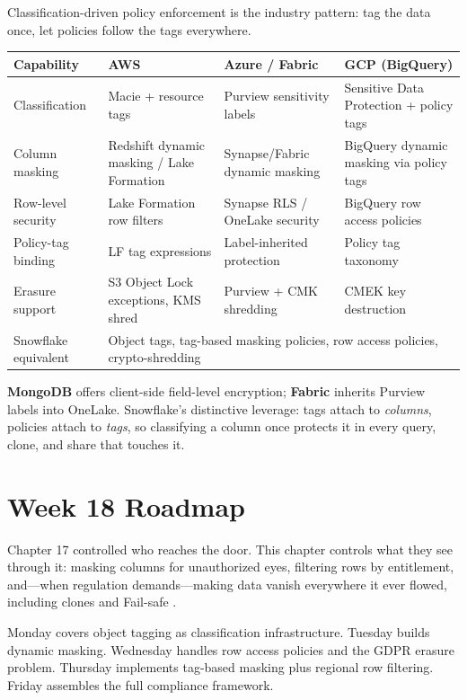 \begin{crosscloud}
Classification-driven policy enforcement is the industry pattern: tag the data once, let policies follow the tags everywhere.

\vspace{2mm}
{\footnotesize
\begin{tabular}{@{}p{2.8cm}p{3.0cm}p{3.0cm}p{3.0cm}@{}}
\toprule
\textbf{Capability} & \textbf{AWS} & \textbf{Azure / Fabric} & \textbf{GCP (BigQuery)} \\
\midrule
Classification & Macie + resource tags & Purview sensitivity labels & Sensitive Data Protection + policy tags \\
Column masking & Redshift dynamic masking / Lake Formation & Synapse/Fabric dynamic masking & BigQuery dynamic masking via policy tags \\
Row-level security & Lake Formation row filters & Synapse RLS / OneLake security & BigQuery row access policies \\
Policy-tag binding & LF tag expressions & Label-inherited protection & Policy tag taxonomy \\
Erasure support & S3 Object Lock exceptions, KMS shred & Purview + CMK shredding & CMEK key destruction \\
\addlinespace
Snowflake equivalent & \multicolumn{3}{l}{Object tags, tag-based masking policies, row access policies, crypto-shredding} \\
\bottomrule
\end{tabular}}

\vspace{1mm}
\textbf{MongoDB} offers client-side field-level encryption; \textbf{Fabric} inherits Purview labels into OneLake. Snowflake's distinctive leverage: tags attach to \emph{columns}, policies attach to \emph{tags}, so classifying a column once protects it in every query, clone, and share that touches it.
\end{crosscloud}

\section{Week 18 Roadmap}
Chapter 17 controlled who reaches the door. This chapter controls what they see through it: masking columns for unauthorized eyes, filtering rows by entitlement, and---when regulation demands---making data vanish everywhere it ever flowed, including clones and Fail-safe \cite{snowflakeMaskingDocs,snowflakeRowAccessDocs}.

Monday covers object tagging as classification infrastructure. Tuesday builds dynamic masking. Wednesday handles row access policies and the GDPR erasure problem. Thursday implements tag-based masking plus regional row filtering. Friday assembles the full compliance framework.

